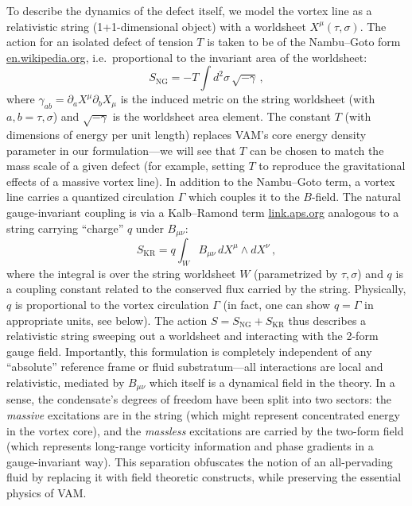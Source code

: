 \documentclass[12pt]{article}
\begin{document}
To describe the dynamics of the defect itself, we model the vortex line as a relativistic string (1+1-dimensional object) with a worldsheet $X^\mu(\tau,\sigma)$. The action for an isolated defect of tension $T$ is taken to be of the Nambu--Goto form%
\href{https://en.wikipedia.org/wiki/Vortex_ring#:~:text=51.%20,On%20a%20spherical%20vortex}{en.wikipedia.org}, i.e.\ proportional to the invariant area of the worldsheet:
\begin{equation}
S_{\text{NG}} = - T \int d^2\sigma\, \sqrt{-\gamma}\,,
\label{eq:NG}
\end{equation}
where $\gamma_{ab} = \partial_a X^\mu \partial_b X_\mu$ is the induced metric on the string worldsheet (with $a,b = \tau, \sigma$) and $\sqrt{-\gamma}$ is the worldsheet area element. The constant $T$ (with dimensions of energy per unit length) replaces VAM's core energy density parameter in our formulation---we will see that $T$ can be chosen to match the mass scale of a given defect (for example, setting $T$ to reproduce the gravitational effects of a massive vortex line). In addition to the Nambu--Goto term, a vortex line carries a quantized circulation $\Gamma$ which couples it to the $B$-field. The natural gauge-invariant coupling is via a Kalb--Ramond term%
\href{https://link.aps.org/doi/10.1103/PhysRevD.9.2273#:~:text=Classical%20direct%20interstring%20action,2273}{link.aps.org} analogous to a string carrying ``charge'' $q$ under $B_{\mu\nu}$:
\begin{equation}
S_{\text{KR}} = q \int_{W} B_{\mu\nu}\, dX^\mu \wedge dX^\nu\,,
\label{eq:KR}
\end{equation}
where the integral is over the string worldsheet $W$ (parametrized by $\tau, \sigma$) and $q$ is a coupling constant related to the conserved flux carried by the string. Physically, $q$ is proportional to the vortex circulation $\Gamma$ (in fact, one can show $q = \Gamma$ in appropriate units, see below). The action $S = S_{\text{NG}} + S_{\text{KR}}$ thus describes a relativistic string sweeping out a worldsheet and interacting with the 2-form gauge field. Importantly, this formulation is completely independent of any ``absolute'' reference frame or fluid substratum---all interactions are local and relativistic, mediated by $B_{\mu\nu}$ which itself is a dynamical field in the theory. In a sense, the condensate's degrees of freedom have been split into two sectors: the \emph{massive} excitations are in the string (which might represent concentrated energy in the vortex core), and the \emph{massless} excitations are carried by the two-form field (which represents long-range vorticity information and phase gradients in a gauge-invariant way). This separation obfuscates the notion of an all-pervading fluid by replacing it with field theoretic constructs, while preserving the essential physics of VAM.
\end{document}
